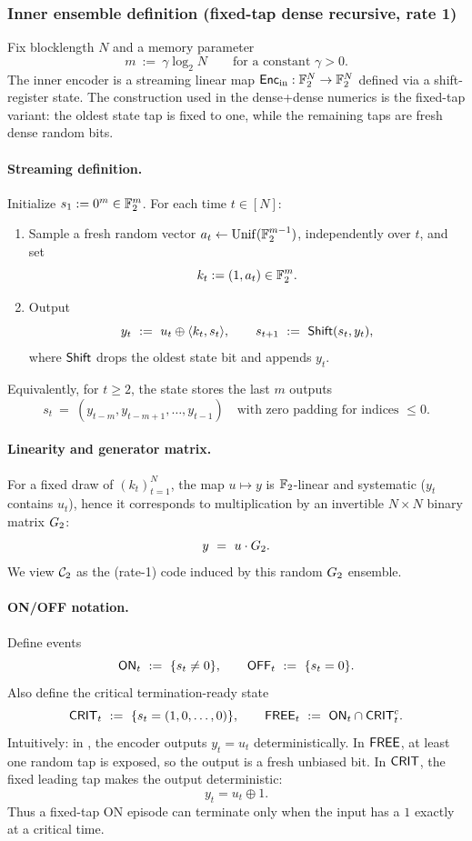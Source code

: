 \subsubsection{Inner ensemble definition (fixed-tap dense recursive, rate 1)}
\label{subsec:inner-dense-def}

Fix blocklength $N$ and a memory parameter
\[
m \ :=\ \gamma \log_2 N
\qquad\text{for a constant }\gamma>0.
\]
The inner encoder is a streaming linear map $\mathsf{Enc}_{\mathrm{in}}:\mathbb{F}_2^N\to\mathbb{F}_2^N$ defined via a shift-register state.
The construction used in the dense+dense numerics is the fixed-tap variant: the oldest state tap is fixed to one,
while the remaining taps are fresh dense random bits.

\paragraph{Streaming definition.}
Initialize $s_1:=0^m\in\mathbb{F}_2^m$.
For each time $t\in[N]$:
\begin{enumerate}
\item Sample a fresh random vector \(a_t\gets\mathrm{Unif}(\mathbb{F}_2^{m-1})\), independently over \(t\), and set
\[
k_t := (1,a_t)\in \mathbb{F}_2^m.
\]
\item Output
\begin{equation}
\label{eq:dense-inner-def}
y_t \ :=\ u_t \oplus \langle k_t, s_t\rangle,
\qquad
s_{t+1}\ :=\ \mathsf{Shift}(s_t,y_t),
\end{equation}
where $\mathsf{Shift}$ drops the oldest state bit and appends $y_t$.
\end{enumerate}
Equivalently, for $t\ge 2$, the state stores the last $m$ outputs
\[
s_t \ =\ (y_{t-m},y_{t-m+1},\dots,y_{t-1})
\quad\text{with zero padding for indices }\le 0.
\]

\paragraph{Linearity and generator matrix.}
For a fixed draw of $(k_t)_{t=1}^N$, the map $u\mapsto y$ is $\mathbb{F}_2$-linear and systematic ($y_t$ contains $u_t$),
hence it corresponds to multiplication by an invertible $N\times N$ binary matrix ${G_2}$:
\[
y \ =\ u \cdot {G_2}.
\]
We view ${\mathcal{C}_2}$ as the (rate-1) code induced by this random ${G_2}$ ensemble.

\paragraph{ON/OFF notation.}
Define events
\[
\mathsf{ON}_t \ :=\ \{s_t\neq 0\},
\qquad
\mathsf{OFF}_t\ :=\ \{s_t=0\}.
\]
Also define the critical termination-ready state
\[
\CRIT_t \ :=\ \{s_t=(1,0,\dots,0)\},
\qquad
\FREE_t \ :=\ \ON_t\cap \CRIT_t^c.
\]
Intuitively: in \OFF, the encoder outputs $y_t=u_t$ deterministically. In \(\mathsf{FREE}\), at least one random tap is exposed,
so the output is a fresh unbiased bit. In \(\mathsf{CRIT}\), the fixed leading tap makes the output deterministic:
\[
y_t = u_t\oplus 1.
\]
Thus a fixed-tap ON episode can terminate only when the input has a \(1\) exactly at a critical time.

